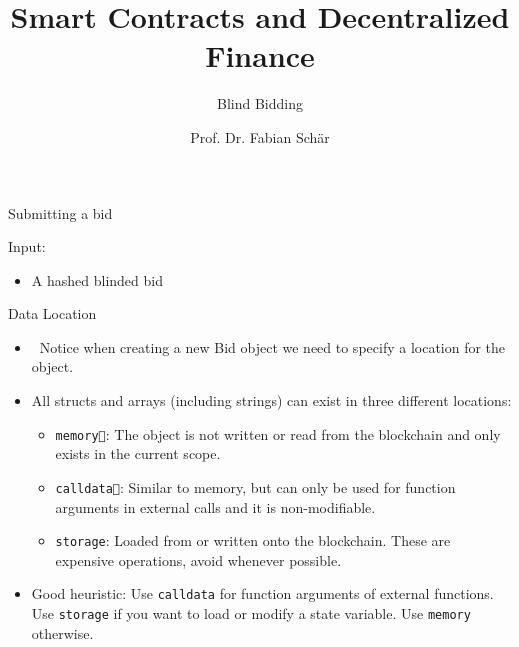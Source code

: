 \documentclass[]{beamer}
\title{Smart Contracts and Decentralized Finance}
\subtitle{Blind Bidding}
\author{Prof. Dr. Fabian Sch\"ar}
\institute{University of Basel}
\begin{document}
\thispagestyle{empty}
\begin{frame}[noframenumbering]
	\titlepage
\end{frame}

\begin{frame}{Submitting a bid}
{
	Input:
	\begin{itemize}
		\item A hashed blinded bid
	\end{itemize}
\vspace{.3cm}
}
\vspace{.3cm}

\end{frame}

\begin{frame}{Data Location}
	\begin{itemize}
		\item<1-> Notice when creating a new Bid object we need to specify a location for the object.
		\item<2-> All structs and arrays (including strings) can exist in three different locations:
		
		\begin{itemize}
			\item<3-> \texttt{memory}: The object is not written or read from the blockchain and only exists in the current scope.
			\item<4-> \texttt{calldata}: Similar to memory, but can only be used for function arguments in external calls and it is non-modifiable.
			\item<5-> \texttt{storage}: Loaded from or written onto the blockchain. These are expensive operations, avoid whenever possible.		
		\end{itemize}
		
		\item<6-> Good heuristic: Use \texttt{calldata} for function arguments of external functions. Use \texttt{storage} if you want to load or modify a state variable. Use \texttt{memory} otherwise.
	\end{itemize}
\end{frame}
\end{document}
